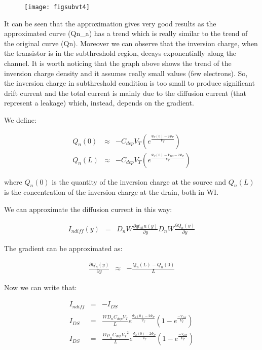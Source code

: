 \documentclass[a4paper, 12pt, twoside, openright]{report}
\begin{document}
	\begin{figure}[H]
	\centering
	\texttt{[image: figsubvt4]}
	\caption{}
	\label{}
	\end{figure}

It can be seen that the approximation gives very good results as the approximated curve (Qn\_a) has a trend which is really similar to the trend of the original curve (Qn). Moreover we can observe that the inversion charge, when the transistor is in the subthreshold region, decays exponentially along the channel. It is worth noticing that the graph above shows the trend of the inversion charge density and it assumes really small values (few electrons). So, the inversion charge in subthreshold condition is too small to produce significant drift current and the total current is mainly due to the diffusion current (that represent a leakage) which, instead, depends on the gradient.

We define:

	\begin{eqnarray*}
	Q_n(0)&\approx&-C_{dep} V_T
	             \left(e^{\displaystyle \frac{\Psi_S(0)-2\Phi_P}{V_T}}
	               \right)\\[2ex]
	Q_n(L)&\approx&-C_{dep} V_T
	             \left(e^{\displaystyle \frac{\Psi_S(0)- {V_{DS}}-2\Phi_P}{V_T}}
	              \right)
	\end{eqnarray*}

where $Q_{n}(0)$ is the quantity of the inversion charge at the source and $Q_{n}(L)$ is the concentration of the inversion charge at the drain, both in WI.

We can approximate the diffusion current in this way:

	 \begin{eqnarray*}
	  I_{ndiff}(y) &=& D_nW \frac{\partial  {qt_{ch} n(y)}}{\partial y} D_nW \frac{\partial Q_n(y)}{\partial y}
	 \end{eqnarray*}

The gradient can be approximated as:

	 \begin{eqnarray*}
	  \frac{\partial Q_n(y)}{\partial y} &\approx& - \frac{Q_n(L)-Q_n(0)}{L}
	 \end{eqnarray*}

Now we can write that:

	 \begin{eqnarray*}
	  I_{ndiff} &=& -I_{DS}\\[2ex]\\
	  I_{DS}    &=& \frac{W D_n C_{dep} V_T}{L}  
	            e^{\displaystyle \frac{ {\Psi_S(0)-2\Phi_P}}{V_T}}
	           \left( 1-e^{\displaystyle\frac{-V_{DS}}{V_T}}\right)\\[2ex]
	  I_{DS}    &=& \frac{W \mu_n C_{dep} {V_T}^2}{L}  
	            e^{\displaystyle \frac{ {\Psi_S(0)-2\Phi_P}}{V_T}}
	           \left( 1-e^{\displaystyle\frac{-V_{DS}}{V_T}}\right)\\[2ex]
	  \end{eqnarray*}
\end{document}
